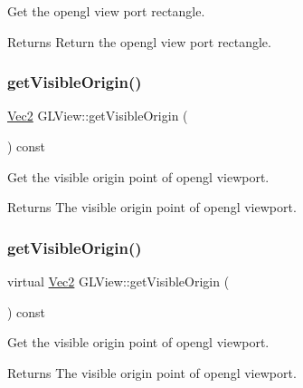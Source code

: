 Get the opengl view port rectangle.

\begin{DoxyReturn}{Returns}
Return the opengl view port rectangle. 
\end{DoxyReturn}
\mbox{\label{classGLView_ad9dd07f5472dc82f3ae71988401bcd81}} 
\subsubsection{\texorpdfstring{get\+Visible\+Origin()}{getVisibleOrigin()}\hspace{0.1cm}{\footnotesize\ttfamily [1/2]}}
{\footnotesize\ttfamily \hyperlink{classVec2}{Vec2} G\+L\+View\+::get\+Visible\+Origin (\begin{DoxyParamCaption}{ }\end{DoxyParamCaption}) const\hspace{0.3cm}{\ttfamily [virtual]}}

Get the visible origin point of opengl viewport.

\begin{DoxyReturn}{Returns}
The visible origin point of opengl viewport. 
\end{DoxyReturn}
\mbox{\label{classGLView_acb5d330576705d12b2468282f8def3b2}} 
\subsubsection{\texorpdfstring{get\+Visible\+Origin()}{getVisibleOrigin()}\hspace{0.1cm}{\footnotesize\ttfamily [2/2]}}
{\footnotesize\ttfamily virtual \hyperlink{classVec2}{Vec2} G\+L\+View\+::get\+Visible\+Origin (\begin{DoxyParamCaption}{ }\end{DoxyParamCaption}) const\hspace{0.3cm}{\ttfamily [virtual]}}

Get the visible origin point of opengl viewport.

\begin{DoxyReturn}{Returns}
The visible origin point of opengl viewport. 
\end{DoxyReturn}
\mbox{\label{classGLView_a72ed119a20fd0dfe89890770c2824cd3}} 
